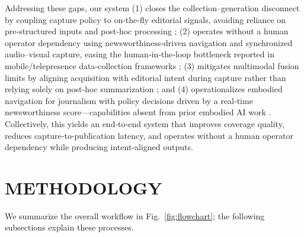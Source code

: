 \documentclass[letterpaper, 10 pt, conference]{ieeeconf}  %
\begin{document}
Addressing these gaps, our system (1) closes the collection–generation disconnect by coupling capture policy to on‑the‑fly editorial signals, avoiding reliance on pre‑structured inputs and post‑hoc processing \cite{diakopoulos2019automating,graefe2016guide,reuters_tracer2017,xiaomingbot2020,blab_reporter2022}; (2) operates without a human operator dependency using newsworthi\-ness‑driven navigation and synchronized audio–visual capture, easing the human‑in‑the‑loop bottleneck reported in mobile/telepresence data‑collection frameworks \cite{adversarial_data_collection_2025,sharedassembly_2025,robots_diary_studies_2025}; (3) mitigates multi\-modal fusion limits by aligning acquisition with editorial intent during capture rather than relying solely on post‑hoc summarization \cite{mast2020,mhms2022,video_summarization_2024}; and (4) operationalizes embodied navigation for journalism with policy decisions driven by a real‑time newsworthi\-ness score—capabilities absent from prior embodied AI work \cite{embodied_survey_2024,duet2022,saycan2022}. Collectively, this yields an end‑to‑end system that improves coverage quality, reduces capture‑to‑publication latency, and operates without a human operator dependency while producing intent‑aligned outputs.

\section{METHODOLOGY}


We summarize the overall workflow in Fig.~\ref{fig:flowchart}; the following subsections explain these processes.
\end{document}
